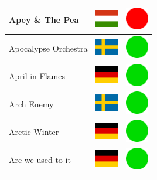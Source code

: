 \documentclass[12pt, a4paper, twoside]{report}
\begin{document}
\begin{center}
\begin{longtable}{|p{5cm}|p{2cm}|p{2cm}|}
 Apey \& The Pea                                            & \includegraphics[width=1cm]{4x3/hu} &   \includegraphics[width=1cm]{likes/n} \\ \hline
 Apocalypse Orchestra                                       & \includegraphics[width=1cm]{4x3/se} &   \includegraphics[width=1cm]{likes/y} \\ \hline
 April in Flames                                            & \includegraphics[width=1cm]{4x3/de} &   \includegraphics[width=1cm]{likes/y} \\ \hline
 Arch Enemy                                                 & \includegraphics[width=1cm]{4x3/se} &   \includegraphics[width=1cm]{likes/y} \\ \hline
 Arctic Winter                                              & \includegraphics[width=1cm]{4x3/de} &   \includegraphics[width=1cm]{likes/y} \\ \hline
 Are we used to it                                          & \includegraphics[width=1cm]{4x3/de} &   \includegraphics[width=1cm]{likes/y} \\ \hline

\end{longtable}
\end{center}
\end{document}
